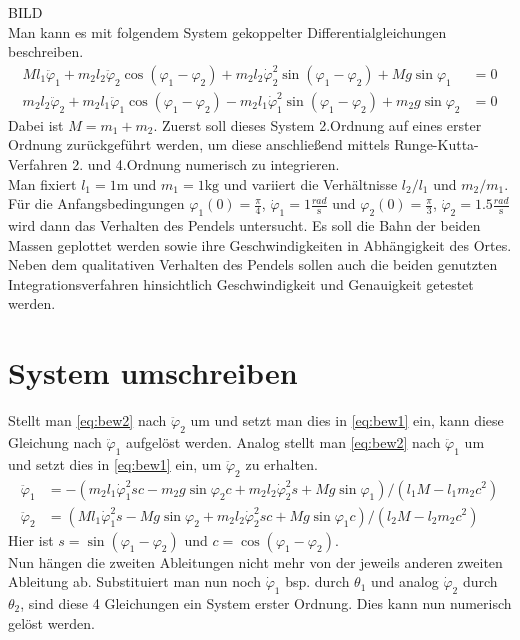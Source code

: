 \documentclass[12pt,a4paper,titlepage,headinclude,bibtotoc]{scrartcl}
\begin{document}
BILD\\
Man kann es mit folgendem System gekoppelter Differentialgleichungen beschreiben.
\begin{align}
	Ml_1\ddot{\varphi}_1 + m_2l_2\ddot{\varphi}_2\cos\left(\varphi_1-\varphi_2\right) + m_2l_2\dot{\varphi}_2^2\sin\left(\varphi_1-\varphi_2\right) + Mg\sin\varphi_1 &= 0 \label{eq:bew1} \\
	m_2l_2\ddot{\varphi}_2 + m_2l_1\ddot{\varphi}_1\cos\left(\varphi_1-\varphi_2\right) - m_2l_1\dot{\varphi}_1^2\sin\left(\varphi_1-\varphi_2\right) + m_2g\sin\varphi_2&=0 \label{eq:bew2}
\end{align}
Dabei ist $M=m_1+m_2$.
Zuerst soll dieses System 2.Ordnung auf eines erster Ordnung zurückgeführt werden, um diese anschließend mittels Runge-Kutta-Verfahren 2. und 4.Ordnung numerisch zu integrieren.\\
Man fixiert $l_1=1\si{\meter}$ und $m_1=1\si{\kilo\gram}$ und variiert die Verhältnisse $l_2/l_1$ und $m_2/m_1$.
Für die Anfangsbedingungen $\varphi_1(0)=\frac{\pi}{4}$, $\dot{\varphi}_1=1 \frac{\si{rad}}{\si{\second}}$ und $\varphi_2(0)=\frac{\pi}{3}$, $\dot{\varphi}_2=1.5 \frac{\si{rad}}{\si{\second}}$ wird dann das Verhalten des Pendels untersucht.
Es soll die Bahn der beiden Massen geplottet werden sowie ihre Geschwindigkeiten in Abhängigkeit des Ortes.
Neben dem qualitativen Verhalten des Pendels sollen auch die beiden genutzten Integrationsverfahren hinsichtlich Geschwindigkeit und Genauigkeit getestet werden.

\section{System umschreiben}
Stellt man \eqref{eq:bew2} nach $\ddot{\varphi}_2$ um und setzt man dies in \eqref{eq:bew1} ein, kann diese Gleichung nach $\ddot{\varphi}_1$ aufgelöst werden. Analog stellt man \eqref{eq:bew2} nach $\ddot{\varphi}_1$ um und setzt dies in \eqref{eq:bew1} ein, um $\ddot{\varphi}_2$ zu erhalten. 
\begin{align}
	\ddot{\varphi}_1 &= -\left(m_2l_1\dot{\varphi}_1^2sc - m_2g\sin\varphi_2c + m_2l_2\dot{\varphi}_2^2s+Mg\sin\varphi_1 \right)/ \left(l_1M-l_1m_2c^2\right)\\
	\ddot{\varphi}_2 &= \left(Ml_1\dot{\varphi}_1^2s - Mg\sin\varphi_2 + m_2l_2\dot{\varphi}_2^2sc+Mg\sin\varphi_1c \right)/ \left(l_2M-l_2m_2c^2\right)
\end{align}
Hier ist $s=\sin\left(\varphi_1-\varphi_2\right)$ und $c=\cos\left(\varphi_1-\varphi_2\right)$.\\
Nun hängen die zweiten Ableitungen nicht mehr von der jeweils anderen zweiten Ableitung ab.
Substituiert man nun noch $\dot{\varphi}_1$ bsp. durch $\theta_1$ und analog $\dot{\varphi}_2$ durch $\theta_2$, sind diese 4 Gleichungen ein System erster Ordnung.
Dies kann nun numerisch gelöst werden. 
\end{document}
